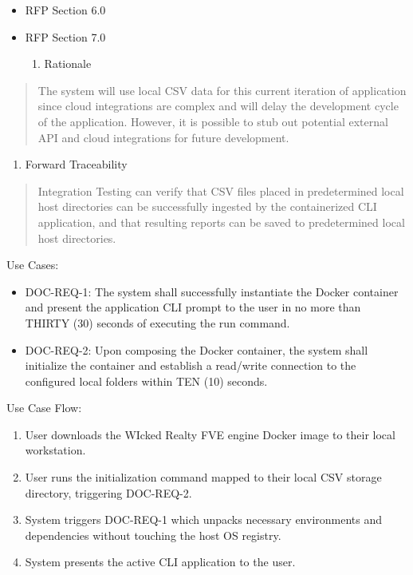 \begin{itemize}
\item
  RFP Section 6.0
\item
  RFP Section 7.0

  \begin{enumerate}
  \def\labelenumi{\roman{enumi}.}
  \item
    Rationale
  \end{enumerate}
\end{itemize}

\begin{quote}
The system will use local CSV data for this current iteration of
application since cloud integrations are complex and will delay the
development cycle of the application. However, it is possible to stub
out potential external API and cloud integrations for future
development.
\end{quote}

\begin{enumerate}
\def\labelenumi{\alph{enumi}.}
\item
  Forward Traceability
\end{enumerate}

\begin{quote}
Integration Testing can verify that CSV files placed in predetermined
local host directories can be successfully ingested by the containerized
CLI application, and that resulting reports can be saved to
predetermined local host directories.
\end{quote}

Use Cases:

\begin{itemize}
\item
  DOC-REQ-1: The system shall successfully instantiate the Docker
  container and present the application CLI prompt to the user in no
  more than THIRTY (30) seconds of executing the run command.
\item
  DOC-REQ-2: Upon composing the Docker container, the system shall
  initialize the container and establish a read/write connection to the
  configured local folders within TEN (10) seconds.
\end{itemize}

Use Case Flow:

\begin{enumerate}
\def\labelenumi{\arabic{enumi}.}
\item
  User downloads the WIcked Realty FVE engine Docker image to their
  local workstation.
\item
  User runs the initialization command mapped to their local CSV storage
  directory, triggering DOC-REQ-2.
\item
  System triggers DOC-REQ-1 which unpacks necessary environments and
  dependencies without touching the host OS registry.
\item
  System presents the active CLI application to the user.
\end{enumerate}

